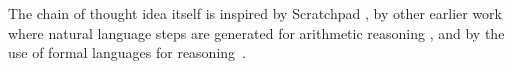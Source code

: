 The chain of thought idea itself is inspired by Scratchpad \citep{nye2021show}, by other earlier work where natural language
steps are generated for arithmetic reasoning
\citep{ling2017program,cobbe2021training}, and by the use of formal languages for reasoning~\citep{roy2016solving,chiang2018semantically,amini2019mathqa,chen2019neural}.

%


